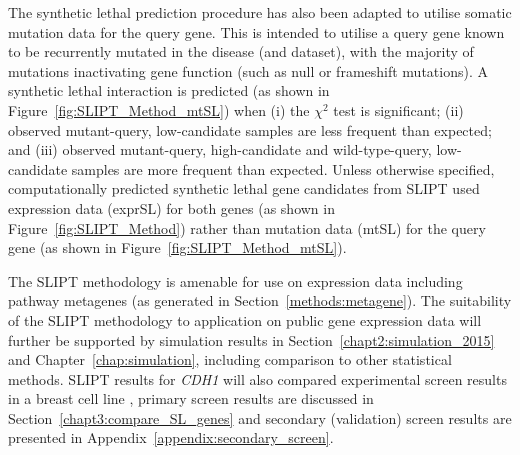 The synthetic lethal prediction procedure has also been adapted to utilise somatic mutation data for the query gene. This is intended to utilise a query gene known to be recurrently mutated in the disease (and dataset), with the majority of mutations inactivating gene function (such as null or frameshift mutations). A synthetic lethal interaction is predicted  (as shown in Figure~\ref{fig:SLIPT_Method_mtSL}) when (i) the $\chi^2$ test is significant; (ii) observed mutant-query, low-candidate samples are less frequent than expected; and (iii) observed mutant-query, high-candidate and wild-type-query, low-candidate samples are more frequent than expected. Unless otherwise specified, computationally predicted synthetic lethal gene candidates from \gls{SLIPT} used expression data (exprSL) for both genes (as shown in Figure~\ref{fig:SLIPT_Method}) rather than mutation data (mtSL) for the query gene (as shown in Figure~\ref{fig:SLIPT_Method_mtSL}).

\begin{figure*}[!tb]
\begin{mdframed}
  \begin{center}
  \resizebox{0.8 \textwidth}{!}{
    \fbox{}
   }
   \end{center}
   \caption[Synthetic lethal prediction adapted for mutation]{\small \textbf{Synthetic lethal prediction adapted for mutation.} \gls{SLIPT} was also adapted to identify candidate interacting genes using (somatic) mutation data of the query gene in the $\chi^2$ test. Samples are sorted into low, medium, and high expression quantiles for each candidate gene and tested for a directional shift against mutation status of the query gene. A sample having low expression or mutation for the synthetic lethal pair is expected to be unlikely with a corresponding increase in frequency of sample with mutant-high or wild-type-low gene pairs. Synthetic lethal candidate (mtSL) partners of a gene are identified by running this procedure on all possible partner genes, selecting those with an FDR-adjusted $\chi^2$ p-value of $p < 0.05$, and meeting the directional criteria. %
}
\label{fig:SLIPT_Method_mtSL}
\end{mdframed}
\end{figure*}

The \gls{SLIPT} methodology is amenable for use on expression data including pathway metagenes (as generated in Section~\ref{methods:metagene}). The suitability of the \gls{SLIPT} methodology to application on public gene expression data will further be supported by simulation results in Section~\ref{chapt2:simulation_2015} and Chapter~\ref{chap:simulation}, including comparison to other statistical methods. \gls{SLIPT} results for \textit{CDH1} will also compared experimental screen results in a breast cell line \citep{Telford2015}, primary screen results are discussed in Section~\ref{chapt3:compare_SL_genes} and secondary (validation) screen results are presented in Appendix~\ref{appendix:secondary_screen}.

